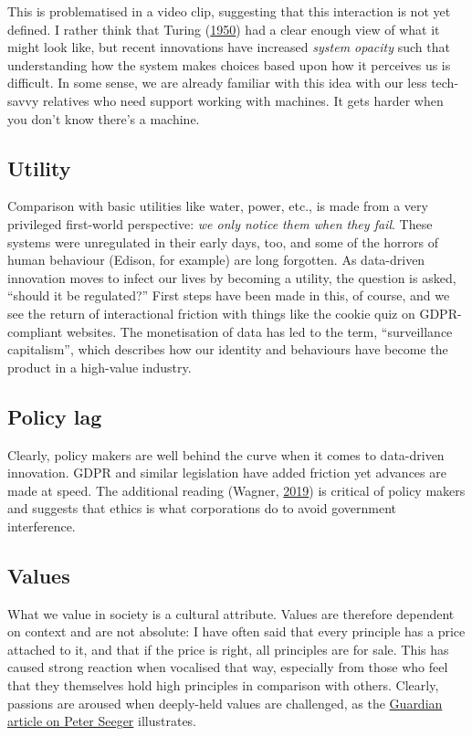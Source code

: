 \documentclass[
]{book}
\begin{document}
This is problematised in a video clip, suggesting that this interaction is not yet defined. I rather think that Turing (\protect\hyperlink{ref-TURING1950}{1950}) had a clear enough view of what it might look like, but recent innovations have increased \emph{system opacity} such that understanding how the system makes choices based upon how it perceives us is difficult. In some sense, we are already familiar with this idea with our less tech-savvy relatives who need support working with machines. It gets harder when you don't know there's a machine.

\hypertarget{utility}{%
\subsection{Utility}\label{utility}}

Comparison with basic utilities like water, power, etc., is made from a very privileged first-world perspective: \emph{we only notice them when they fail}. These systems were unregulated in their early days, too, and some of the horrors of human behaviour (Edison, for example) are long forgotten. As data-driven innovation moves to infect our lives by becoming a utility, the question is asked, ``should it be regulated?'' First steps have been made in this, of course, and we see the return of interactional friction with things like the cookie quiz on GDPR-compliant websites. The monetisation of data has led to the term, ``surveillance capitalism'', which describes how our identity and behaviours have become the product in a high-value industry.

\hypertarget{policy-lag}{%
\subsection{Policy lag}\label{policy-lag}}

Clearly, policy makers are well behind the curve when it comes to data-driven innovation. GDPR and similar legislation have added friction yet advances are made at speed. The additional reading (Wagner, \protect\hyperlink{ref-Hildebrandt2019}{2019}) is critical of policy makers and suggests that ethics is what corporations do to avoid government interference.

\hypertarget{values}{%
\subsection{Values}\label{values}}

What we value in society is a cultural attribute. Values are therefore dependent on context and are not absolute: I have often said that every principle has a price attached to it, and that if the price is right, all principles are for sale. This has caused strong reaction when vocalised that way, especially from those who feel that they themselves hold high principles in comparison with others. Clearly, passions are aroused when deeply-held values are challenged, as the \href{https://www.theguardian.com/lifeandstyle/1999/nov/06/weekend.kevintoolis}{Guardian article on Peter Seeger} illustrates.
\end{document}
